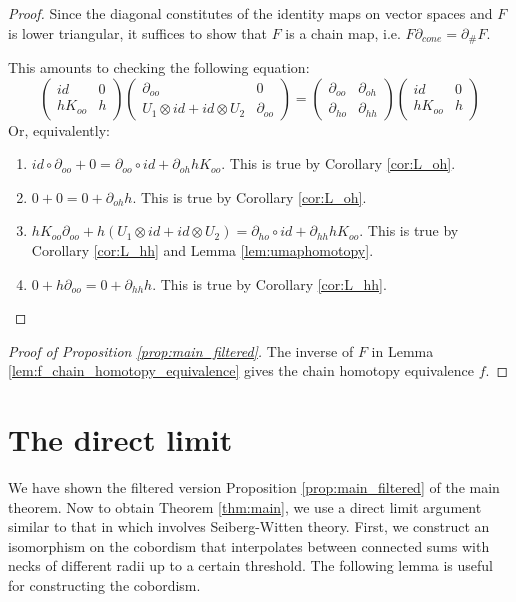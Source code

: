 \documentclass{article}
\numberwithin{equation}{section}
\theoremstyle{definition}
\begin{document}
\begin{proof}
Since the diagonal constitutes of the identity maps on vector spaces and $F$ is lower triangular, it suffices to show that $F$ is a chain map, i.e. $F\partial_{cone} = \partial_\# F$.

This amounts to checking the following equation:
$$\begin{pmatrix}
id & 0\\
hK_{oo} & h
\end{pmatrix}
\begin{pmatrix}
\partial_{oo} & 0\\
U_1\otimes id + id \otimes U_2 & \partial_{oo}
\end{pmatrix}=
\begin{pmatrix}
\partial_{oo} & \partial_{oh}\\
\partial_{ho} & \partial_{hh}
\end{pmatrix}\begin{pmatrix}
id & 0\\
hK_{oo} & h
\end{pmatrix}
$$
Or, equivalently:
\begin{enumerate}
    \item $id \circ\partial_{oo} + 0 = \partial_{oo}\circ id +\partial_{oh}h K_{oo}$. This is true by Corollary \ref{cor:L_oh}.

    \item $0 + 0 = 0 + \partial_{oh} h$. This is true by Corollary \ref{cor:L_oh}. 
    
    \item $hK_{oo}\partial_{oo} + h(U_1\otimes id + id \otimes U_2) = \partial_{ho}\circ id + \partial_{hh}h K_{oo}$. This is true by Corollary \ref{cor:L_hh} and Lemma \ref{lem:umaphomotopy}.
    
    \item $0 + h\partial_{oo} = 0 + \partial_{hh}h$. This is true by Corollary \ref{cor:L_hh}.
\end{enumerate}
\end{proof}

\begin{proof}[Proof of Proposition \ref{prop:main_filtered}]
    The inverse of $F$ in Lemma \ref{lem:f_chain_homotopy_equivalence} gives the chain homotopy equivalence $f$.
\end{proof}



\section{The direct limit}
\label{sec:direct_limit}
We have shown the filtered version Proposition \ref{prop:main_filtered} of the main theorem. Now to obtain Theorem \ref{thm:main}, we use a direct limit argument similar to that in \cite{Nelson_Morgan} which involves Seiberg-Witten theory. First, we construct an isomorphism on the cobordism that interpolates between connected sums with necks of different radii up to a certain threshold. The following lemma is useful for constructing the cobordism.
\end{document}

